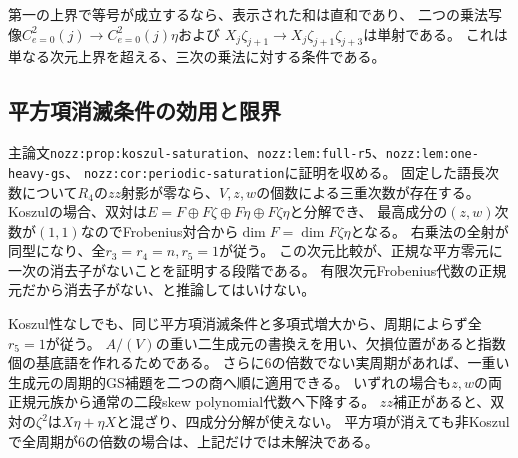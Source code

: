 \documentclass[11pt,a4paper]{ltjsarticle}
\begin{document}
第一の上界で等号が成立するなら、表示された和は直和であり、
二つの乗法写像$C^2_{e=0}(j)\to C^2_{e=0}(j)\eta$および
$X_j\zeta_{j+1}\to X_j\zeta_{j+1}\zeta_{j+3}$は単射である。
これは単なる次元上界を超える、三次の乗法に対する条件である。

\subsection{平方項消滅条件の効用と限界}
\label{note:nozz-structure}
主論文\texttt{nozz:prop:koszul-saturation}、\texttt{nozz:lem:full-r5}、\texttt{nozz:lem:one-heavy-gs}、
\texttt{nozz:cor:periodic-saturation}に証明を収める。
固定した語長次数について$R_4$の$zz$射影が零なら、$V,z,w$の個数による三重次数が存在する。
Koszulの場合、双対は$E=F\oplus F\zeta\oplus F\eta\oplus F\zeta\eta$と分解でき、
最高成分の$(z,w)$次数が$(1,1)$なのでFrobenius対合から$\dim F=\dim F\zeta\eta$となる。
右乗法の全射が同型になり、全$r_3=r_4=n,r_5=1$が従う。
この次元比較が、正規な平方零元に一次の消去子がないことを証明する段階である。
有限次元Frobenius代数の正規元だから消去子がない、と推論してはいけない。

Koszul性なしでも、同じ平方項消滅条件と多項式増大から、周期によらず全$r_5=1$が従う。
$A/(V)$の重い二生成元の書換えを用い、欠損位置があると指数個の基底語を作れるためである。
さらに6の倍数でない実周期があれば、一重い生成元の周期的GS補題を二つの商へ順に適用できる。
いずれの場合も$z,w$の両正規元族から通常の二段skew polynomial代数へ下降する。
$zz$補正があると、双対の$\zeta^2$は$X\eta+\eta X$と混ざり、四成分分解が使えない。
平方項が消えても非Koszulで全周期が6の倍数の場合は、上記だけでは未解決である。
\end{document}
